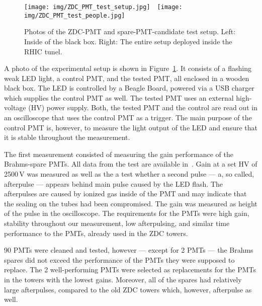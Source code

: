 \begin{figure}[!htb]
\begin{center}
 \texttt{[image: img/ZDC\_PMT\_test\_setup.jpg]}$\quad$\texttt{[image: img/ZDC\_PMT\_test\_people.jpg]}
\end{center}
\caption[Photos of the ZDC-PMT and  test setup for spare-PMT candidates.]{\label{photo_ZDC_PTM_setup}Photos of the ZDC-PMT and spare-PMT-candidate test setup. Left: Inside of the black box. Right: The entire setup deployed inside the RHIC tunel.}
\end{figure}

A photo of the experimental setup is shown in Figure~\ref{photo_ZDC_PTM_setup}\@. It consists of a flashing weak LED light, a control PMT, and the tested PMT, all enclosed in a wooden black box. The LED is controlled by a Beagle Board, powered via a USB charger which supplies the control PMT as well. The tested PMT uses an external high-voltage (HV) power supply. Both, the tested PMT and the control are read out in an oscilloscope that uses the control PMT as a trigger. The main purpose of the control PMT is, however, to measure the light output of the LED and ensure that it is stable throughout the measurement.

The first measurement consisted of measuring the gain performance of the Brahms-spare PMTs. All data from the test are available in~\cite{PMT_spreadsheet}\@. Gain at a set HV of 2500$\,$V was measured as well as the a test whether a second pulse --- a, so called, afterpulse --- appears behind main pulse caused by the LED flash. The afterpulses are caused by ionized gas inside of the PMT and may indicate that the sealing on the tubes had been compromised. The gain was measured as height of the pulse in the oscilloscope. The requirements for the PMTs were high gain, stability throughout our measurement, low afterpulsing, and similar time performance to the PMTs, already used in the ZDC towers. 

90 PMTs were cleaned and tested, however --- except for 2 PMTs --- the Brahms spares did not exceed the performance of the PMTs they were supposed to replace. The 2 well-performing PMTs were selected as replacements for the PMTs in the towers with the lowest gains. Moreover, all of the spares had relatively large afterpulses, compared to the old ZDC towers which, however, afterpulse as well.


